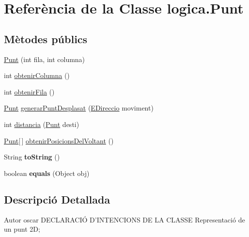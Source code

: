\hypertarget{classlogica_1_1_punt}{\section{Referència de la Classe logica.\+Punt}
\label{classlogica_1_1_punt}
}
\subsection*{Mètodes públics}
\begin{DoxyCompactItemize}
\item 
\hyperlink{classlogica_1_1_punt_ab09e076ff785e505903c303a6b390844}{Punt} (int fila, int columna)
\item 
int \hyperlink{classlogica_1_1_punt_a111fa13504fb44338c3ebae2e4eb104b}{obtenir\+Columna} ()
\item 
int \hyperlink{classlogica_1_1_punt_ac12261ec7534827c8cb7b4cba5bdd5db}{obtenir\+Fila} ()
\item 
\hyperlink{classlogica_1_1_punt}{Punt} \hyperlink{classlogica_1_1_punt_a8198234b3d10d9f83e634b0390c84dcb}{generar\+Punt\+Desplasat} (\hyperlink{enumlogica_1_1enumeracions_1_1_e_direccio}{E\+Direccio} moviment)
\item 
int \hyperlink{classlogica_1_1_punt_a20bb4168bbedb81b73947bfeaf31512a}{distancia} (\hyperlink{classlogica_1_1_punt}{Punt} desti)
\item 
\hyperlink{classlogica_1_1_punt}{Punt}\mbox{[}$\,$\mbox{]} \hyperlink{classlogica_1_1_punt_aae8b444d685a4fab660a51838fc42406}{obtenir\+Posicions\+Del\+Voltant} ()
\item 
\hypertarget{classlogica_1_1_punt_a7ecb9a24b9520b5036471fae8ef3aad5}{String {\bfseries to\+String} ()}\label{classlogica_1_1_punt_a7ecb9a24b9520b5036471fae8ef3aad5}

\item 
\hypertarget{classlogica_1_1_punt_a2734ff6782d3a601961365f018ba4402}{boolean {\bfseries equals} (Object obj)}\label{classlogica_1_1_punt_a2734ff6782d3a601961365f018ba4402}

\end{DoxyCompactItemize}


\subsection{Descripció Detallada}
\begin{DoxyAuthor}{Autor}
oscar D\+E\+C\+L\+A\+R\+A\+C\+IÓ D'I\+N\+T\+E\+N\+C\+I\+O\+N\+S D\+E L\+A C\+L\+A\+S\+S\+E Representació de un punt 2\+D; 
\end{DoxyAuthor}


